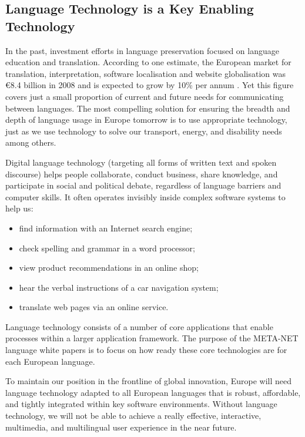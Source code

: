 \begin{multicols}{2}
\subsection{Language Technology is a Key Enabling Technology}


In the past, investment efforts in language preservation focused on language education and translation.
According to one estimate, the European market for translation, interpretation, software localisation and website globalisation was €8.4 billion in 2008 and is expected to grow by 10\% per annum \cite{Meta51}.
Yet this figure covers just a small proportion of current and future needs for communicating between languages.
The most compelling solution for ensuring the breadth and depth of language usage in Europe tomorrow is to use appropriate technology, just as we use technology to solve our transport, energy, and disability needs among others.

Digital language technology (targeting all forms of written text and spoken discourse) helps people collaborate, conduct business, share knowledge, and participate in social and political debate, regardless of language barriers and computer skills.
It often operates invisibly inside complex software systems to help us:

\begin{itemize}
\item  find information with an Internet search engine;
\item  check spelling and grammar in a word processor;
\item  view product recommendations in an online shop;
\item  hear the verbal instructions of a car navigation system;
\item  translate web pages via an online service.
\end{itemize}
Language technology consists of a number of core applications that enable processes within a larger application framework.
The purpose of the META-NET language white papers is to focus on how ready these core technologies are for each European language. 

To maintain our position in the frontline of global innovation, Europe will need language technology adapted to all European languages that is robust, affordable, and tightly integrated within key software environments.
 Without language technology, we will not be able to achieve a really effective, interactive, multimedia, and multilingual user experience in the near future. 


\end{multicols}
